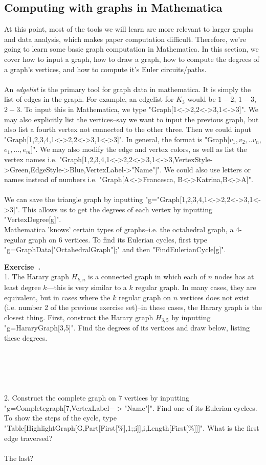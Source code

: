 \documentclass[12pt]{article}
\newcounter{exercise}[section]
\newenvironment{exercise}[1][]{\refstepcounter{exercise}\par\medskip
	\noindent \textbf{Exercise~\thesection.\theexercise #1} \rmfamily}{\medskip}
\begin{document}
\subsection{Computing with graphs in Mathematica}
At this point, most of the tools we will learn are more relevant to larger graphs and data analysis, which makes paper computation difficult. Therefore, we're going to learn some basic graph computation in Mathematica. In this section, we cover how to input a graph, how to draw a graph, how to compute the degrees of a graph's vertices, and how to compute it's Euler circuits/paths.
\\
\\
An \emph{edgelist} is the primary tool for graph data in mathematica. It is simply the list of edges in the graph. For example, an edgelist for $K_3$ would be $1-2$, $1-3$, $2-3$.
To input this in Mathematica, we type "Graph[{1<->2,2<->3,1<->3}]". We may also explicitly list the vertices--say we want to input the previous graph, but also list a fourth vertex not connected to the other three. Then we could input "Graph[{1,2,3,4},{1<->2,2<->3,1<->3}]". In general, the format is "Graph[{$v_1,v_2,..v_n$},{$e_1,...,e_m$}]". We may also modify the edge and vertex colors, as well as list the vertex names i.e. "Graph[{1,2,3,4},{1<->2,2<->3,1<->3},VertexStyle->Green,EdgeStyle->Blue,VertexLabel->"Name"]". We could also use letters or names instead of numbers i.e. "Graph[{A<->Francesca, B<->Katrina,B<->A}]".
\\
\\
We can save the triangle graph by inputting "g="Graph[{1,2,3,4},{1<->2,2<->3,1<->3}]". This allows us to get the degrees of each vertex by inputting "VertexDegree[g]".\\
Mathematica 'knows' certain types of graphs--i.e. the octahedral graph, a 4-regular graph on 6 vertices. To find its Eulerian cycles, first type "g=GraphData["OctahedralGraph"];" and then "FindEulerianCycle[g]".
\begin{exercise}\\
1. The Harary graph $H_{k,n}$ is a connected graph in which each of $n$ nodes has at least degree $k$---this is very similar to a $k$ regular graph. In many cases, they are equivalent, but in cases where the $k$ regular graph on $n$ vertices does not exist (i.e. number 2 of the previous exercise set)--in these cases, the Harary graph is the closest thing. First, construct the Harary graph $H_{3,5}$ by inputting "g=HararyGraph[3,5]". Find the degrees of its vertices and draw below, listing these degrees.
\\
\\
\\
\\
\\
\\
2. Construct the complete graph on $7$ vertices by inputting \\"g=Completegraph[7,VertexLabel$->$"Name"]". Find one of its Eulerian cyclces. To show the steps of the cycle, type "Table[HighlightGraph[G,Part[First[\%],1;;i]],{i,Length[First[\%]]}]". What is the first edge traversed?
\\
\\
The last?
\\
\end{exercise}
\end{document}
